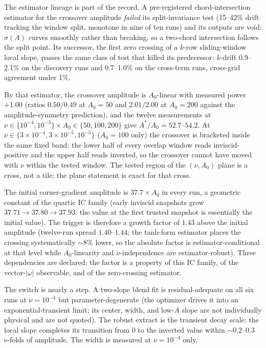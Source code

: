 \documentclass[11pt]{article}
\newcommand{\om}{\omega}
\newcommand{\Anaught}{A_0}
\begin{document}
The estimator lineage is part of the record. A pre-registered
chord-intersection estimator for the crossover amplitude \emph{failed}
its split-invariance test (15--42\% drift tracking the window split,
monotone in nine of ten runs) and its outputs are void: $\sigma(A)$
curves smoothly rather than breaking, so a two-chord intersection
follows the split point. Its successor, the first zero crossing of a
$k$-row sliding-window local slope, passes the same class of test that
killed its predecessor: $k$-drift 0.9--2.1\% on the discovery runs and
0.7--1.0\% on the cross-term runs, cross-grid agreement under 1\%.

By that estimator, the crossover amplitude is $\Anaught$-linear with
measured power $+1.00$ (ratios $0.50/0.49$ at $\Anaught=50$ and
$2.01/2.00$ at $\Anaught=200$ against the amplitude-symmetry
prediction), and the twelve measurements at
$\nu\in\{10^{-4},10^{-3}\}\times\Anaught\in\{50,100,200\}$ give
$A^{*}/\Anaught=52.7$--$54.2$. At $\nu\in\{3\times10^{-4},
3\times10^{-5},10^{-5}\}$ ($\Anaught=100$ only) the crossover is
bracketed inside the same fixed band: the lower half of every overlap
window reads inviscid-positive and the upper half reads inverted, so
the crossover cannot have moved with $\nu$ within the tested window.
The tested region of the $(\nu,\Anaught)$ plane is a cross, not a tile;
the plane statement is exact for that cross.

The initial corner-gradient amplitude is $37.7\times\Anaught$ in every
run, a geometric constant of the quartic IC family (early inviscid
snapshots grow $37.71\to37.80\to37.93$: the value at the first trusted
snapshot is essentially the initial value). The trigger is therefore a
growth factor of $1.43$ above the initial amplitude (twelve-run spread
$1.40$--$1.44$; the tanh-form estimator places the crossing
systematically ${\sim}8\%$ lower, so the absolute factor is
estimator-conditional at that level while $\Anaught$-linearity and
$\nu$-independence are estimator-robust). Three dependencies are
declared: the factor is a property of this IC family, of the
vector-$|\om|$ observable, and of the zero-crossing estimator.

The switch is nearly a step. A two-slope blend fit is
residual-adequate on all six runs at $\nu=10^{-4}$ but
parameter-degenerate (the optimizer drives it into an
exponential-transient limit; its center, width, and low-$A$ slope are
not individually physical and are not quoted). The robust extract is
the transient decay scale: the local slope completes its transition
from $0$ to the inverted value within ${\sim}0.2$--$0.3$ e-folds of
amplitude. The width is measured at $\nu=10^{-4}$ only.
\end{document}
